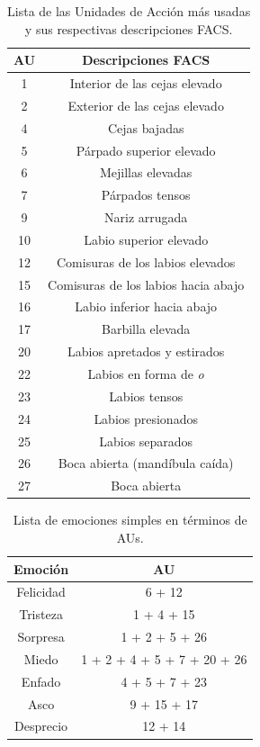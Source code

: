 \begin{table}[H]
\begin{center}
\begin{tabular}{|c|c|}
     \hline
    \textbf{AU} & \textbf{Descripciones FACS} \\
    \hline
     1 & Interior de las cejas elevado\\ 
     2 & Exterior de las cejas elevado \\ 
     4 & Cejas bajadas \\
     5 & Párpado superior elevado\\
     6 & Mejillas elevadas \\ 
     7 & Párpados tensos \\
     9 & Nariz arrugada \\
     10 & Labio superior elevado \\
     12 & Comisuras de los labios elevados \\ 
     15 & Comisuras de los labios hacia abajo \\
     16 & Labio inferior hacia abajo \\
     17 & Barbilla elevada \\
     20 & Labios apretados y estirados\\
     22 & Labios en forma de \textit{o} \\
     23 & Labios tensos \\
     24 & Labios presionados \\
     25 & Labios separados \\
     26 & Boca abierta (mandíbula caída)\\
     27 & Boca abierta \\
     \hline
 \end{tabular}
 \captionsetup{justification=centering}
\caption{Lista de las Unidades de Acción más usadas y sus respectivas descripciones FACS.}
\label{cuadro:au}
\end{center}
\end{table}

\begin{table}[H]
\begin{center}
\begin{tabular}{|c|c|}
     \hline
    \textbf{Emoción} & \textbf{AU} \\
    \hline
     Felicidad & 6 + 12\\ 
     Tristeza & 1 + 4 + 15 \\ 
     Sorpresa & 1 + 2 + 5 + 26 \\
     Miedo & 1 + 2 + 4 + 5 + 7 + 20 + 26\\
     Enfado & 4 + 5 + 7 + 23 \\ 
     Asco & 9 + 15 + 17 \\
     Desprecio & 12 + 14 \\
     \hline
 \end{tabular}
 \captionsetup{justification=centering}
\caption{Lista de emociones simples en términos de AUs.}
\label{cuadro:emfacs}
\end{center}
\end{table}


